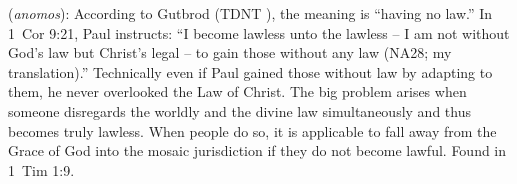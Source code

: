 \item[Lawless,]

(\textit{anomos}):
According to Gutbrod (TDNT ), the meaning is ``having no law.'' In 1~Cor 9:21, Paul instructs: ``I become lawless unto the lawless -- I am not without God's law but Christ's legal -- to gain those without any law (NA28; my translation).'' Technically even if Paul gained those without law by adapting to them, he never overlooked the Law of Christ. The big problem arises when someone disregards the worldly and the divine law simultaneously and thus becomes truly lawless. When people do so, it is applicable to fall away from the Grace of God into the mosaic jurisdiction if they do not become lawful.
Found in 1~Tim 1:9.
